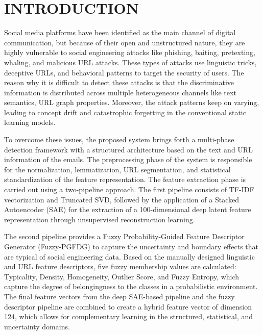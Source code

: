 

\chapter{INTRODUCTION} %
Social media platforms have been identified as the main channel of digital communication, but because of their open and unstructured nature, they are highly vulnerable to social engineering attacks like phishing, baiting, pretexting, whaling, and malicious URL attacks. These types of attacks use linguistic tricks, deceptive URLs, and behavioral patterns to target the security of users. The reason why it is difficult to detect these attacks is that the discriminative information is distributed across multiple heterogeneous channels like text semantics, URL graph properties. Moreover, the attack patterns keep on varying, leading to concept drift and catastrophic forgetting in the conventional static learning models.

To overcome these issues, the proposed system brings forth a multi-phase detection framework with a structured architecture based on the text and URL information of the emails. The preprocessing phase of the system is responsible for the normalization, lemmatization, URL segmentation, and statistical standardization of the feature representation. The feature extraction phase is carried out using a two-pipeline approach. The first pipeline consists of TF-IDF vectorization and Truncated SVD, followed by the application of a Stacked Autoencoder (SAE) for the extraction of a 100-dimensional deep latent feature representation through unsupervised reconstruction learning.

The second pipeline provides a Fuzzy Probability-Guided Feature Descriptor Generator (Fuzzy-PGFDG) to capture the uncertainty and boundary effects that are typical of social engineering data. Based on the manually designed linguistic and URL feature descriptors, five fuzzy membership values are calculated: Typicality, Density, Homogeneity, Outlier Score, and Fuzzy Entropy, which capture the degree of belongingness to the classes in a probabilistic environment. The final feature vectors from the deep SAE-based pipeline and the fuzzy descriptor pipeline are combined to create a hybrid feature vector of dimension 124, which allows for complementary learning in the structured, statistical, and uncertainty domains.

